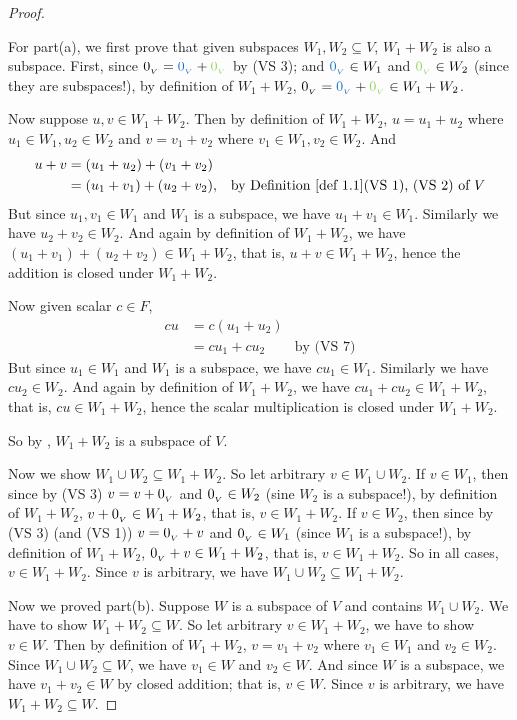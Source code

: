 \begin{proof}\ 

For part(a), we first prove that given subspaces \(W_1, W_2 \subseteq V\), \(W_1 + W_2\) is also a subspace.
First, since \(\OV = \BLUE{\OV} + \GREEN{\OV}\) by (VS 3);
and \(\BLUE{\OV} \in W_1\) and \(\GREEN{\OV} \in W_2\) (since they are subspaces!), by definition of \(W_1 + W_2\), \(\OV = \BLUE{\OV} + \GREEN{\OV} \in W_1 + W_2\).

Now suppose \(u, v \in W_1 + W_2\).
Then by definition of \(W_1 + W_2\), \(u = u_1 + u_2\) where \(u_1 \in W_1, u_2 \in W_2\) and \(v = v_1 + v_2\) where \(v_1 \in W_1, v_2 \in W_2\).
And
\begin{align*}
    u + v & = (u_1 + u_2) + (v_1 + v_2) \\
          & = (u_1 + v_1) + (u_2 + v_2), & \text{by \DEF{1.1}(VS 1), (VS 2) of \(V\)}
\end{align*}
But since \(u_1, v_1 \in W_1\) and \(W_1\) is a subspace, we have \(u_1 + v_1 \in W_1\).
Similarly we have \(u_2 + v_2 \in W_2\).
And again by definition of \(W_1 + W_2\), we have \((u_1 + v_1) + (u_2 + v_2) \in W_1 + W_2\), that is, \(u + v \in W_1 + W_2\), hence the addition is closed under \(W_1 + W_2\).

Now given scalar \(c \in F\),
\begin{align*}
    c u & = c(u_1 + u_2) \\
        & = c u_1 + c u_2 & \text{by (VS 7)}
\end{align*}
But since \(u_1 \in W_1\) and \(W_1\) is a subspace, we have \(c u_1 \in W_1\).
Similarly we have \(c u_2 \in W_2\).
And again by definition of \(W_1 + W_2\), we have \(c u_1 + c u_2 \in W_1 + W_2\), that is, \(c u \in W_1 + W_2\), hence the scalar multiplication is closed under \(W_1 + W_2\).

So by , \(W_1 + W_2\) is a subspace of \(V\).

Now we show \(W_1 \cup W_2 \subseteq W_1 + W_2\).
So let arbitrary \(v \in W_1 \cup W_2\).
If \(v \in W_1\), then since by (VS 3) \(v = v + 0_{_V}\) and \(0_{_V} \in W_2\) (sine \(W_2\) is a subspace!), by definition of \(W_1 + W_2\), \(v + 0_{_V} \in W_1 + W_2\), that is, \(v \in W_1 + W_2\).
If \(v \in W_2\), then since by (VS 3) (and (VS 1)) \(v = 0_{_V} + v\) and \(0_{_V} \in W_1\) (since \(W_1\) is a subspace!), by definition of \(W_1 + W_2\), \(0_{_V} + v \in W_1 + W_2\), that is, \(v \in W_1 + W_2\).
So in all cases, \(v \in W_1 + W_2\).
Since \(v\) is arbitrary, we have \(W_1 \cup W_2 \subseteq W_1 + W_2\).

Now we proved part(b).
Suppose \(W\) is a subspace of \(V\) and contains \(W_1 \cup W_2\).
We have to show \(W_1 + W_2 \subseteq W\).
So let arbitrary \(v \in W_1 + W_2\), we have to show \(v \in W\).
Then by definition of \(W_1 + W_2\), \(v = v_1 + v_2\) where \(v_1 \in W_1\) and \(v_2 \in W_2\).
Since \(W_1 \cup W_2 \subseteq W\), we have \(v_1 \in W\) and \(v_2 \in W\).
And since \(W\) is a subspace, we have \(v_1 + v_2 \in W\) by closed addition;
that is, \(v \in W\).
Since \(v\) is arbitrary, we have \(W_1 + W_2 \subseteq W\).
\end{proof}

